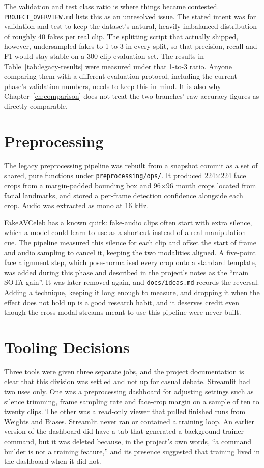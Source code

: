 The validation and test class ratio is where things became contested.
\texttt{PROJECT\_OVERVIEW.md} lists this as an unresolved issue. The stated
intent was for validation and test to keep the dataset's natural, heavily
imbalanced distribution of roughly 40 fakes per real clip. The splitting
script that actually shipped, however, undersampled fakes to 1-to-3 in every
split, so that precision, recall and F1 would stay stable on a 300-clip
evaluation set. The results in Table~\ref{tab:legacy-results} were measured
under that 1-to-3 ratio. Anyone comparing them with a different evaluation
protocol, including the current phase's validation numbers, needs to keep this
in mind. It is also why Chapter~\ref{ch:comparison} does not treat the two
branches' raw accuracy figures as directly comparable.

\section{Preprocessing}

The legacy preprocessing pipeline was rebuilt from a snapshot commit as a set
of shared, pure functions under \texttt{preprocessing/ops/}. It produced
224$\times$224 face crops from a margin-padded bounding box and 96$\times$96
mouth crops located from facial landmarks, and stored a per-frame detection
confidence alongside each crop. Audio was extracted as mono at 16 kHz.

FakeAVCeleb has a known quirk: fake-audio clips often start with extra
silence, which a model could learn to use as a shortcut instead of a real
manipulation cue. The pipeline measured this silence for each clip and
offset the start of frame and audio sampling to cancel it, keeping the two
modalities aligned. A five-point face alignment step, which pose-normalised
every crop onto a standard template, was added during this phase and described
in the project's notes as the ``main SOTA gain''. It was later removed again,
and \texttt{docs/ideas.md} records the reversal. Adding a technique, keeping it
long enough to measure, and dropping it when the effect does not hold up is a
good research habit, and it deserves credit even though the cross-modal streams
meant to use this pipeline were never built.

\section{Tooling Decisions}

Three tools were given three separate jobs, and the project documentation is
clear that this division was settled and not up for casual debate. Streamlit
had two uses only. One was a preprocessing dashboard for adjusting settings
such as silence trimming, frame sampling rate and face-crop margin on a sample
of ten to twenty clips. The other was a read-only viewer that pulled finished
runs from Weights and Biases. Streamlit never ran or contained a training loop.
An earlier version of the dashboard did have a tab that generated a
background-trainer command, but it was deleted because, in the project's own
words, ``a command builder is not a training feature,'' and its presence
suggested that training lived in the dashboard when it did not.

